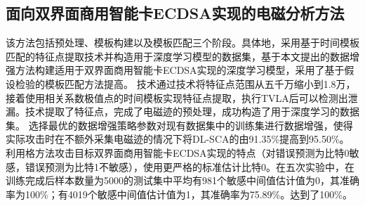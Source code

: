 {	\subsection{面向双界面商用智能卡ECDSA实现的电磁分析方法}
	
	
	
	该方法包括预处理、模板构建以及模板匹配三个阶段。具体地，采用基于时间模板匹配的特征点提取技术并构造用于深度学习模型的数据集，基于本文提出的数据增强方法构建适用于双界面商用智能卡ECDSA实现的深度学习模型，采用了基于假设检验的模板匹配方法提高\zyx。
	\yuchuli 技术通过\poifanwei 技术将特征点范围从五千万缩小到1.8万，接着使用相关系数极值点的时间模板实现特征点提取，执行TVLA后可以检测出泄漏。\yuchuli 技术提取了特征点，完成了电磁迹的预处理，成功构造了用于深度学习的数据集。
	\shujuzengqiang 选择最优的数据增强策略参数对现有数据集中的训练集进行数据增强，使得实际攻击时在不额外采集电磁迹的情况下将DL-SCA的\zyx 由91.35\%提高到95.50\%。
	\jiashejianyanguji 利用格方法攻击目标双界面商用智能卡ECDSA实现的特点（对错误预测为比特0敏感，错误预测为比特1不敏感），使用更严格的标准估计比特0。在五次实验中，在训练完成后样本数量为5000的测试集中平均有981个敏感中间值估计值为0，其准确率为100\%；有4019个敏感中间值估计值为1，其准确率为75.89\%。\zyx 达到了100\%。
	
}
